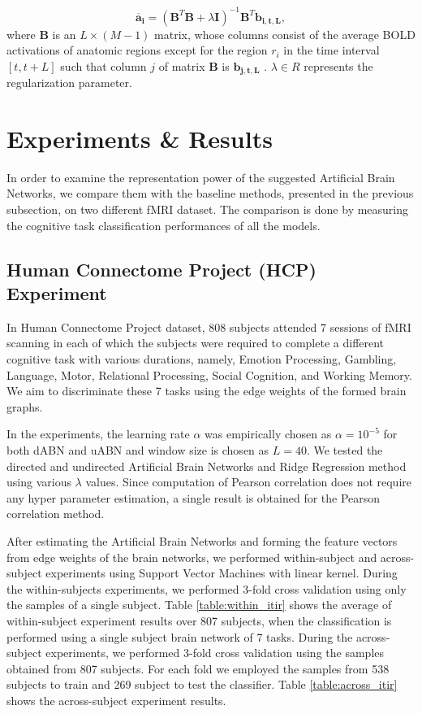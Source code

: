 \documentclass[runningheads]{llncs}
\begin{document}
\begin{equation}
\mathbf{\overline{a}_{i}} = (\mathbf{B}^{T}\mathbf{B} + \lambda \mathbf{I})^{-1}\mathbf{B}^{T} \mathbf{b_{i,t,L}} ,
\end{equation}
where $\mathbf{B}$ is an $L \times (M-1)$ matrix, whose columns consist of the average BOLD activations of anatomic regions except for the region $r_i$ in the time interval $[t, t+L]$ such that column $j$ of matrix $\mathbf{B}$ is $\mathbf{b_{j,t,L}}$ . $\lambda \in R$ represents the regularization parameter. 

\section{Experiments \& Results}

In order to examine the representation power of the suggested Artificial Brain Networks,  we compare them with the baseline methods, presented in the previous subsection, on two different fMRI dataset. The comparison is done by measuring the cognitive task classification performances  of all the models.

\subsection{Human Connectome Project (HCP) Experiment}

In Human Connectome Project dataset, 808 subjects attended 7 sessions of fMRI scanning in each of which the subjects were required to complete a different cognitive task with various durations, namely, Emotion Processing, Gambling, Language, Motor, Relational Processing, Social Cognition, and Working Memory. We aim to discriminate these 7 tasks using the edge weights of the formed brain graphs. 


In the experiments, the learning rate $\alpha$ was empirically chosen as $\alpha = 10^{-5}$ for both dABN and uABN and window size is chosen as $L = 40$. We tested the directed and undirected Artificial Brain Networks and Ridge Regression method using various $\lambda$ values. Since computation of Pearson correlation does not require any hyper parameter  estimation, a single result is obtained for the Pearson correlation method. 


After estimating the Artificial Brain Networks and forming the feature vectors from edge weights of the brain networks, we performed within-subject and across-subject experiments using Support Vector Machines with linear kernel. During the within-subjects experiments, we performed 3-fold cross validation using only the samples of a single subject. Table \ref{table:within_itir} shows the average of within-subject experiment results over 807 subjects, when the classification is performed using a single subject brain network of 7 tasks. During the across-subject experiments, we performed 3-fold cross validation using the samples obtained from 807 subjects. For each fold we employed the samples from 538 subjects to train and 269 subject to test the classifier. Table \ref{table:across_itir} shows the across-subject experiment results. %
 
\end{document}
